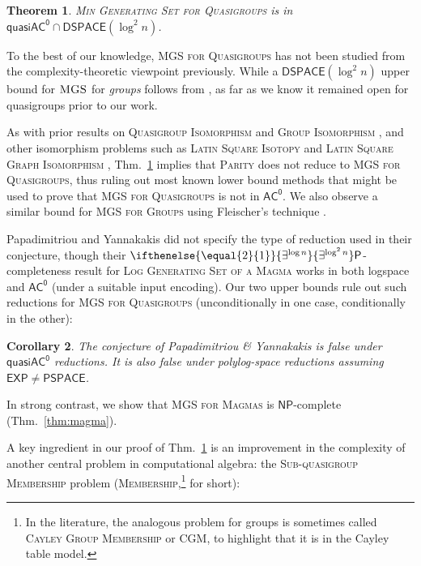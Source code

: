 \documentclass{article}
\newtheorem{theorem}{Theorem}\newtheorem{lemma}[theorem]{Lemma}\newtheorem{proposition}[theorem]{Proposition}\newtheorem{corollary}[theorem]{Corollary}\newtheorem{definition}[theorem]{Definition}\newtheorem{claim}[theorem]{Claim}\newtheorem{remark}[theorem]{Remark}\newtheorem{observation}[theorem]{Observation}\newtheorem{conjecture}[theorem]{Conjecture}\newtheorem{example}[theorem]{Example}
\newcommand{\algprobm}[1]{\textsc{#1}\xspace}
\newcommand{\betacc}[1]{\ifthenelse{\equal{#1}{1}}{\exists^{\log n}}{\exists^{\log^{#1}n}}} %
\newcommand*{\ComplexityClass}[1]{\ensuremath{\mathsf{#1}}\xspace}
\newcommand*{\NP}{\ComplexityClass{NP}}
\renewcommand{\P}{\ComplexityClass{P}}
\newcommand*{\EXP}{\ComplexityClass{EXP}}
\newcommand*{\PSPACE}{\ComplexityClass{PSPACE}}
\newcommand{\ACz}{\ComplexityClass{AC^0}}
\newcommand{\qACz}{\ComplexityClass{quasiAC^0}}
\newcommand{\DSPACE}{\ComplexityClass{DSPACE}}
\begin{document}
\begin{theorem} \label{thm:main-mgsq}
\algprobm{Min Generating Set for Quasigroups} is in $\qACz \cap \DSPACE(\log^2 n)$. 
\end{theorem}

To the best of our knowledge, \algprobm{MGS for Quasigroups} has not been studied from the complexity-theoretic viewpoint previously. While a $\DSPACE(\log^2 n)$ upper bound for $\algprobm{MGS}$ for \emph{groups} follows from \cite{TangThesis, ArvindToran}, as far as we know it remained open for quasigroups prior to our work. 

As with prior results on \algprobm{Quasigroup Isomorphism} and \algprobm{Group Isomorphism} \cite{ChattopadhyayToranWagner}, and other isomorphism problems such as  \algprobm{Latin Square Isotopy} and  \algprobm{Latin Square Graph Isomorphism} \cite{LevetLatinSquares}, Thm.~\ref{thm:main-mgsq} implies that \algprobm{Parity} does not reduce to \algprobm{MGS for Quasigroups}, thus ruling out most known lower bound methods that might be used to prove that \algprobm{MGS for Quasigroups} is not in $\ACz$. We also observe a similar bound for \algprobm{MGS for Groups} using Fleischer's technique \cite{Fleischer}. 

Papadimitriou and Yannakakis did not specify the type of reduction used in their conjecture, though their $\betacc{2}\P$-completeness result for \algprobm{Log Generating Set of a Magma} works in both logspace and $\ACz$ (under a suitable input encoding). Our two upper bounds rule out such reductions for \algprobm{MGS for Quasigroups} (unconditionally in one case, conditionally in the other):

\begin{corollary}
The conjecture of Papadimitriou \& Yannakakis \cite[p.~169]{PY} is false under $\qACz$ reductions. It is also false under polylog-space reductions assuming $\EXP \neq \PSPACE$.
\end{corollary}

In strong contrast, we show that \algprobm{MGS for Magmas} is \NP-complete (Thm.~\ref{thm:magma}).

A key ingredient in our proof of Thm.~\ref{thm:main-mgsq} is an improvement in the complexity of another central problem in computational algebra: the \algprobm{Sub-quasigroup Membership} problem (\algprobm{Membership},\footnote{In the literature, the analogous problem for groups is sometimes called \algprobm{Cayley Group Membership} or \algprobm{CGM}, to highlight that it is in the Cayley table model.} for short):
\end{document}
